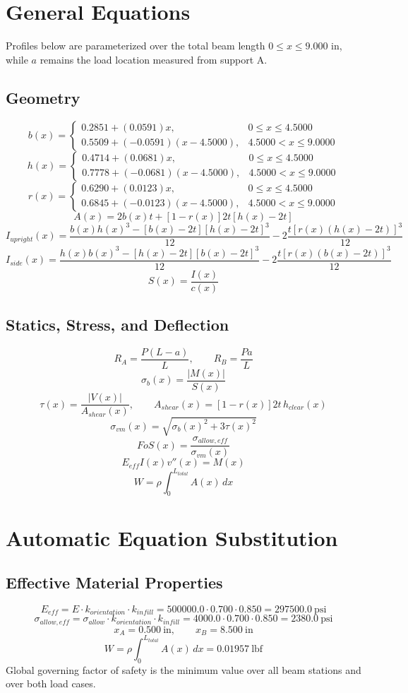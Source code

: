 \documentclass[11pt]{article}
\begin{document}
\section*{General Equations}
Profiles below are parameterized over the total beam length $0 \le x \le 9.000$ in, while $a$ remains the load location measured from support A.
\subsection*{Geometry}
\[
b(x)=\begin{cases}0.2851 + (0.0591)x, & 0 \le x \le 4.5000\\0.5509 + (-0.0591)(x-4.5000), & 4.5000 < x \le 9.0000\end{cases}
\]
\[
h(x)=\begin{cases}0.4714 + (0.0681)x, & 0 \le x \le 4.5000\\0.7778 + (-0.0681)(x-4.5000), & 4.5000 < x \le 9.0000\end{cases}
\]
\[
r(x)=\begin{cases}0.6290 + (0.0123)x, & 0 \le x \le 4.5000\\0.6845 + (-0.0123)(x-4.5000), & 4.5000 < x \le 9.0000\end{cases}
\]
\[
A(x)=2b(x)t+[1-r(x)]2t[h(x)-2t]
\]
\[
I_{upright}(x)=\frac{b(x)h(x)^3-[b(x)-2t][h(x)-2t]^3}{12}-2\frac{t[r(x)(h(x)-2t)]^3}{12}
\]
\[
I_{side}(x)=\frac{h(x)b(x)^3-[h(x)-2t][b(x)-2t]^3}{12}-2\frac{t[r(x)(b(x)-2t)]^3}{12}
\]
\[
S(x)=\frac{I(x)}{c(x)}
\]

\subsection*{Statics, Stress, and Deflection}
\[
R_A=\frac{P(L-a)}{L}, \qquad R_B=\frac{Pa}{L}
\]
\[
\sigma_b(x)=\frac{|M(x)|}{S(x)}
\]
\[
\tau(x)=\frac{|V(x)|}{A_{shear}(x)}, \qquad A_{shear}(x)=[1-r(x)]2t\,h_{clear}(x)
\]
\[
\sigma_{vm}(x)=\sqrt{\sigma_b(x)^2+3\tau(x)^2}
\]
\[
FoS(x)=\frac{\sigma_{allow,eff}}{\sigma_{vm}(x)}
\]
\[
E_{eff}I(x)v''(x)=M(x)
\]
\[
W=\rho\int_0^{L_{total}} A(x)\,dx
\]

\section*{Automatic Equation Substitution}
\subsection*{Effective Material Properties}
\[E_{eff} = E \cdot k_{orientation} \cdot k_{infill} = 500000.0 \cdot 0.700 \cdot 0.850 = 297500.0\ \mathrm{psi}\]
\[\sigma_{allow,eff} = \sigma_{allow} \cdot k_{orientation} \cdot k_{infill} = 4000.0 \cdot 0.700 \cdot 0.850 = 2380.0\ \mathrm{psi}\]
\[x_A = 0.500\ \mathrm{in}, \qquad x_B = 8.500\ \mathrm{in}\]
\[W = \rho \int_0^{L_{total}} A(x)\,dx = 0.01957\ \mathrm{lbf}\]
Global governing factor of safety is the minimum value over all beam stations and over both load cases.
\end{document}
